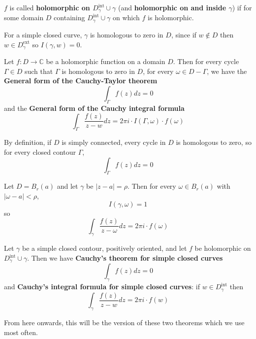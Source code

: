\begin{definition}
	$f$ is called \textbf{holomorphic on $D_{\gamma}^{\text{int}} \cup \gamma$} (and \textbf{holomorphic on and inside $\gamma$}) if for some domain $D$ containing $D_{\gamma}^{\text{int}} \cup \gamma$ on which $f$ is holomorphic.
\end{definition}

\begin{remark}
	For a simple closed curve, $\gamma$ is homologous to zero in $D$, since if $w \notin D$ then $w \in D_{\gamma}^{\text{ext}}$ so $I(\gamma, w) = 0$.
\end{remark}

\begin{theorem}
	Let $f: D \rightarrow \mathbb{C}$ be a holomorphic function on a domain $D$. Then for every cycle $\Gamma \in D$ such that $\Gamma$ is homologous to zero in $D$, for every $\omega \in D - \Gamma$, we have the \textbf{General form of the Cauchy-Taylor theorem}
	\[
		\int_{\Gamma} f(z) dz = 0
	\]
	and the \textbf{General form of the Cauchy integral formula}
	\[
		\int_{\Gamma} \frac{f(z)}{z - w} dz = 2 \pi i \cdot I(\Gamma, \omega) \cdot f(\omega)
	\]
\end{theorem}

\begin{example}
	By definition, if $D$ is simply connected, every cycle in $D$ is homologous to zero, so for every closed contour $\Gamma$,
	\[
		\int_{\Gamma} f(z) dz = 0
	\]
\end{example}

\begin{example}
	Let $D = B_r(a)$ and let $\gamma$ be $|z - a| = \rho$. Then for every $\omega \in B_r(a)$ with $|\omega - a| < \rho$,
	\[
		I(\gamma, \omega) = 1
	\]
	so
	\[
		\int_{\gamma} \frac{f(z)}{z - \omega} dz = 2 \pi i \cdot f(\omega)
	\]
\end{example}

\begin{theorem}
	Let $\gamma$ be a simple closed contour, positively oriented, and let $f$ be holomorphic on $D_{\gamma}^{\text{int}} \cup \gamma$. Then we have \textbf{Cauchy's theorem for simple closed curves}
	\[
		\int_{\gamma} f(z) dz = 0
	\]
	and \textbf{Cauchy's integral formula for simple closed curves}: if $w \in D_{\gamma}^{\text{int}}$ then
	\[
		\int_{\gamma} \frac{f(z)}{z - w} dz = 2 \pi i \cdot f(w)
	\]
\end{theorem}

\begin{remark}
	From here onwards, this will be the version of these two theorems which we use most often.
\end{remark}

